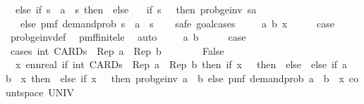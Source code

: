 \begin{isabellebody}
\ \ else\ {\isacharparenleft}{\kern0pt}if\ s\ {\isacharplus}{\kern0pt}\ a\ {\isacharless}{\kern0pt}\ s{\isacharprime}{\kern0pt}\ then\ {}\ else\isanewline
\ \ \ if\ s{\isacharprime}{\kern0pt}\ {\isacharequal}{\kern0pt}\ {}\ then\ prob{\isacharunderscore}{\kern0pt}ge{\isacharunderscore}{\kern0pt}inv\ {\isacharparenleft}{\kern0pt}s{\isacharplus}{\kern0pt}a{\isacharparenright}{\kern0pt}\isanewline
\ \ \ else\ pmf\ demand{\isacharunderscore}{\kern0pt}prob\ {\isacharparenleft}{\kern0pt}s\ {\isacharplus}{\kern0pt}\ a\ {\isacharminus}{\kern0pt}\ s{\isacharprime}{\kern0pt}{\isacharparenright}{\kern0pt}{\isacharparenright}{\kern0pt}{\isacharparenright}{\kern0pt}\isanewline
\ \ {\isachardoublequoteclose}\isanewline
%
\isadelimproof
%
\endisadelimproof
%
\isatagproof
{}\isamarkupfalse%
\ {\isacharparenleft}{\kern0pt}safe{\isacharcomma}{\kern0pt}\ goal{\isacharunderscore}{\kern0pt}cases{\isacharparenright}{\kern0pt}\isanewline
\ \ \isamarkupfalse%
\ {\isacharparenleft}{\kern0pt}{}\ a\ b\ x{\isacharparenright}{\kern0pt}\isanewline
\ \ \isamarkupfalse%
\ \isamarkupfalse%
\ {\isacharquery}{\kern0pt}case\ \isamarkupfalse%
\ prob{\isacharunderscore}{\kern0pt}ge{\isacharunderscore}{\kern0pt}inv{\isacharunderscore}{\kern0pt}def\ \isamarkupfalse%
\ pmf{\isacharunderscore}{\kern0pt}finite{\isacharunderscore}{\kern0pt}le\ \isamarkupfalse%
\ auto\isanewline
{}\isamarkupfalse%
\isanewline
\ \ \isamarkupfalse%
\ {\isacharparenleft}{\kern0pt}{}\ a\ b{\isacharparenright}{\kern0pt}\isanewline
\ \ \isamarkupfalse%
\ \isamarkupfalse%
\ {\isacharquery}{\kern0pt}case\isanewline
\ \ \isamarkupfalse%
\ {\isacharparenleft}{\kern0pt}cases\ {\isachardoublequoteopen}int\ CARD{\isacharparenleft}{\kern0pt}{\isacharprime}{\kern0pt}s{\isacharparenright}{\kern0pt}\ {\isasymle}\ Rep\ a\ {\isacharplus}{\kern0pt}\ Rep\ b{\isachardoublequoteclose}{\isacharparenright}{\kern0pt}\ \ \isamarkupfalse%
\isanewline
\ \ \ \ \isamarkupfalse%
\ False\isanewline
\ \ \ \ \isamarkupfalse%
\ {\isachardoublequoteopen}{\isacharparenleft}{\kern0pt}{\isasymintegral}\isactrlsup {\isacharplus}{\kern0pt}\ x{\isachardot}{\kern0pt}\ ennreal\ {\isacharparenleft}{\kern0pt}if\ int\ CARD{\isacharparenleft}{\kern0pt}{\isacharprime}{\kern0pt}s{\isacharparenright}{\kern0pt}\ {\isasymle}\ Rep\ a\ {\isacharplus}{\kern0pt}\ Rep\ b\ then\ if\ x\ {\isacharequal}{\kern0pt}\ {}\ then\ {}\ else\ {}\ else\ if\ a\ {\isacharplus}{\kern0pt}\ b\ {\isacharless}{\kern0pt}\ x\ then\ {}\ else\ if\ x\ {\isacharequal}{\kern0pt}\ {}\ then\ prob{\isacharunderscore}{\kern0pt}ge{\isacharunderscore}{\kern0pt}inv\ {\isacharparenleft}{\kern0pt}a\ {\isacharplus}{\kern0pt}\ b{\isacharparenright}{\kern0pt}\ else\ pmf\ demand{\isacharunderscore}{\kern0pt}prob\ {\isacharparenleft}{\kern0pt}a\ {\isacharplus}{\kern0pt}\ b\ {\isacharminus}{\kern0pt}\ x{\isacharparenright}{\kern0pt}{\isacharparenright}{\kern0pt}\ {\isasympartial}count{\isacharunderscore}{\kern0pt}space\ UNIV{\isacharparenright}{\kern0pt}\ {\isacharequal}{\kern0pt}\isanewline

\end{isabellebody}

